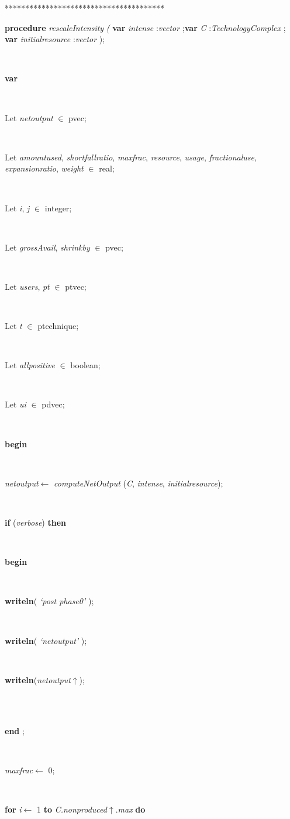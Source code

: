 \begin{tabbing}
***\=***\=***\=***\=***\=***\=***\=***\=***\=***\=***\=***\=***\=\kill
\parbox{14cm}{\textsf{\textbf{procedure}  \textit{rescaleIntensity} \textit{(} \textbf{var}  \textit{intense} :\textit{vector} ;\textbf{var}  \textit{C} :\textit{TechnologyComplex}  ; \textbf{var}  \textit{initialresource} :\textit{vector} );}}\\
\+\parbox{14cm}{\textsf{\textbf{var} }}\\
\parbox{14cm}{\textsf{Let \textit{netoutput} $\in$ pvec;}}\\
\parbox{14cm}{\textsf{Let \textit{amountused}, \textit{shortfallratio}, \textit{maxfrac}, \textit{resource}, \textit{usage}, \textit{fractionaluse}, \textit{expansionratio}, \textit{weight} $\in$ real;}}\\
\parbox{14cm}{\textsf{Let \textit{i}, \textit{j} $\in$ integer;}}\\
\parbox{14cm}{\textsf{Let \textit{grossAvail}, \textit{shrinkby} $\in$ pvec;}}\\
\parbox{14cm}{\textsf{Let \textit{users}, \textit{pt} $\in$ ptvec;}}\\
\parbox{14cm}{\textsf{Let \textit{t} $\in$ ptechnique;}}\\
\parbox{14cm}{\textsf{Let \textit{allpositive} $\in$ boolean;}}\\
\parbox{14cm}{\textsf{Let \textit{ui} $\in$ pdvec;}}\\
\-\<\+\parbox{14cm}{\textsf{\textbf{begin} }}\\
\parbox{14cm}{\textsf{\textit{netoutput}$\leftarrow$ \textit{computeNetOutput} (\textit{C}, \textit{intense}, \textit{initialresource})}; }\\
\+\parbox{14cm}{\textsf {\textbf {if } \textsf{(\textit{verbose})} \textbf{ then } }}\\
\<\parbox{14cm}{\textsf{\textbf{begin} }}\\
\parbox{14cm}{\textsf{\textbf{writeln}(\textit{\textrm{\textup { `post phase0' } }})}; }\\
\parbox{14cm}{\textsf{\textbf{writeln}(\textit{\textrm{\textup { `netoutput' } }})}; }\\
\parbox{14cm}{\textsf{\textbf{writeln}(\textit{netoutput}$\uparrow$\textit{})}; }\\
\\
\<\-\parbox{14cm}{\textsf{\textbf{end} ;}}\\
\parbox{14cm}{\textsf{\textit{maxfrac}$\leftarrow$ 0}; }\\
\+\parbox{14cm}{\textsf {\textbf {for } \textsf{\textit{i}$\leftarrow$ 1} \textbf{ to } \textsf{\textit{C.nonproduced}$\uparrow$.\textit{max}} \textbf{ do } }}\\

\end{tabbing}
